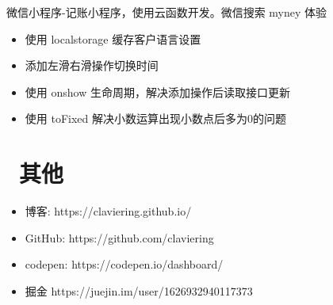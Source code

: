 \documentclass{resume}
\begin{document}
\begin{onehalfspacing}
微信小程序-记账小程序，使用云函数开发。微信搜索 myney 体验
\begin{itemize}
  \item 使用 localstorage 缓存客户语言设置
  \item 添加左滑右滑操作切换时间
  \item 使用 onshow 生命周期，解决添加操作后读取接口更新
  \item 使用 toFixed 解决小数运算出现小数点后多为0的问题
\end{itemize}
\end{onehalfspacing}



\section{\faInfo\ 其他}
\begin{itemize}[parsep=0.5ex]
  \item 博客: https://claviering.github.io/
  \item GitHub: https://github.com/claviering
  \item codepen: https://codepen.io/dashboard/
  \item 掘金 https://juejin.im/user/1626932940117373
\end{itemize}

%
%
\end{document}
